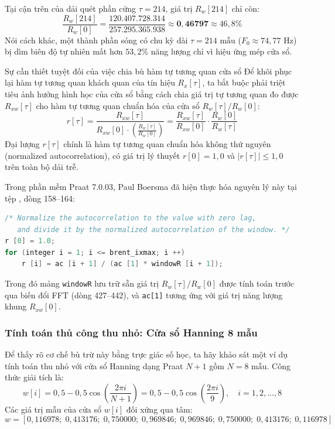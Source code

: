 Tại cận trên của dải quét phần cứng $\tau = 214$, giá trị $R_w[214]$ chỉ còn:
\begin{equation}
\frac{R_w[214]}{R_w[0]} = \frac{120.407.728.314}{257.295.365.938} \approx \mathbf{0{,}46797} \approx 46{,}8\%
\end{equation}
Nói cách khác, một thành phần sóng có chu kỳ dài $\tau = 214\text{ mẫu}$ ($F_0 \approx 74{,}77\text{ Hz}$) bị dìm biên độ tự nhiên mất hơn $53{,}2\%$ năng lượng chỉ vì hiệu ứng mép cửa sổ. 

\begin{firstprin}{Sự cần thiết tuyệt đối của việc chia bù hàm tự tương quan cửa sổ}
Để khôi phục lại hàm tự tương quan khách quan của tín hiệu $R_x[\tau]$, ta bắt buộc phải triệt tiêu ảnh hưởng hình học của cửa sổ bằng cách chia giá trị tự tương quan đo được $R_{xw}[\tau]$ cho hàm tự tương quan chuẩn hóa của cửa sổ $R_w[\tau] / R_w[0]$:
\begin{equation}
r[\tau] = \frac{R_{xw}[\tau]}{R_{xw}[0] \cdot \left( \frac{R_w[\tau]}{R_w[0]} \right)} = \frac{R_{xw}[\tau]}{R_{xw}[0]} \cdot \frac{R_w[0]}{R_w[\tau]}
\label{eq:ch08_norm_exact}
\end{equation}
Đại lượng $r[\tau]$ chính là hàm tự tương quan chuẩn hóa không thứ nguyên (normalized autocorrelation), có giá trị lý thuyết $r[0] = 1{,}0$ và $|r[\tau]| \le 1{,}0$ trên toàn bộ dải trễ.
\end{firstprin}

Trong phần mềm Praat 7.0.03, Paul Boersma đã hiện thực hóa nguyên lý này tại tệp , dòng 158--164:
\begin{lstlisting}[language=C++, numbers=none]
/* Normalize the autocorrelation to the value with zero lag,
   and divide it by the normalized autocorrelation of the window. */
r [0] = 1.0;
for (integer i = 1; i <= brent_ixmax; i ++)
    r [i] = ac [i + 1] / (ac [1] * windowR [i + 1]);
\end{lstlisting}
Trong đó mảng \texttt{windowR} lưu trữ sẵn giá trị $R_w[\tau] / R_w[0]$ được tính toán trước qua biến đổi FFT (dòng 427--442), và \texttt{ac[1]} tương ứng với giá trị năng lượng khung $R_{xw}[0]$.

\subsubsection*{Tính toán thủ công thu nhỏ: Cửa sổ Hanning 8 mẫu}
Để thấy rõ cơ chế bù trừ này bằng trực giác số học, ta hãy khảo sát một ví dụ tính toán thu nhỏ với cửa sổ Hanning dạng Praat $N+1$ gồm $N = 8\text{ mẫu}$. Công thức giải tích là:
\begin{equation}
w[i] = 0{,}5 - 0{,}5 \cos\left(\frac{2\pi i}{N+1}\right) = 0{,}5 - 0{,}5 \cos\left(\frac{2\pi i}{9}\right), \quad i = 1, 2, \dots, 8
\end{equation}
Các giá trị mẫu của cửa sổ $w[i]$ đối xứng qua tâm:
\begin{equation}
w = [0{,}116978;\; 0{,}413176;\; 0{,}750000;\; 0{,}969846;\; 0{,}969846;\; 0{,}750000;\; 0{,}413176;\; 0{,}116978]
\end{equation}

